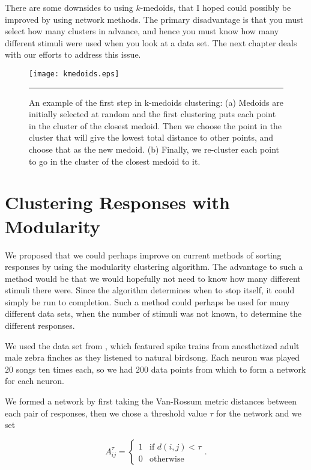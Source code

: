 \documentclass[a4paper,12pt]{report}
\begin{document}
There are some downsides to using $k$-medoids, that I hoped could possibly be 
improved by using network methods.  The primary disadvantage is that you must 
select how many clusters in advance, and hence you must know how many different 
stimuli were used when you look at a data set.  The next chapter deals with our 
efforts to address this issue.

\begin{figure}[t]
  \centering
  \texttt{[image: kmedoids.eps]}
  \rule{35em}{0.5pt}
  \caption{An example of the first step in k-medoids clustering:  (a) Medoids 
    are initially selected at random and the first clustering puts each point 
    in the cluster of the closest medoid. Then we choose the point in the 
    cluster that will give the lowest total distance to other points, and 
    choose that as the new medoid. (b) Finally, we re-cluster each point to go 
    in the cluster of the closest medoid to it.}
  \label{kmed}
\end{figure}

\chapter{Clustering Responses with Modularity}

We proposed that we could perhaps improve on current methods of sorting 
responses by using the modularity clustering algorithm.  The advantage to such 
a method would be that we would hopefully not need to know how many different 
stimuli there were. Since the algorithm determines when to stop itself, it 
could simply be run to completion.  Such a method could perhaps be used for 
many different data sets, when the number of stimuli was not known, to 
determine the different responses.

We used the data set from \cite{NarayanEtAl2006b}, which featured spike trains 
from anesthetized adult male zebra finches as they listened to natural 
birdsong.  Each neuron was played $20$ songs ten times each, so we had $200$ 
data points from which to form a network for each neuron.

We formed a network by first taking the Van-Rossum metric distances between 
each pair of responses, then we chose a threshold value $\tau$ for the network 
and we set

\begin{equation}
A^{\tau}_{ij} = \left\{ \begin{array}{ll} 1 & \mbox{if }d(i,j)<\tau \\
0 & \mbox{otherwise}
\end{array}\right. .
\end{equation}
\end{document}
